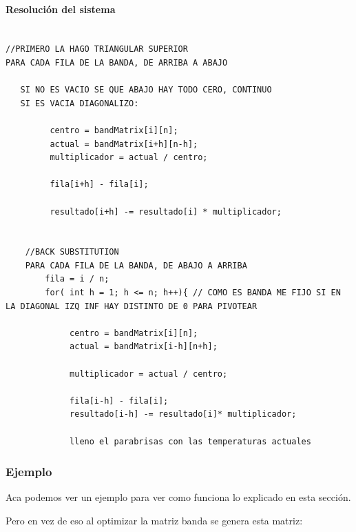 \paragraph{Resolución del sistema}

\begin{verbatim}

//PRIMERO LA HAGO TRIANGULAR SUPERIOR
PARA CADA FILA DE LA BANDA, DE ARRIBA A ABAJO
		
   SI NO ES VACIO SE QUE ABAJO HAY TODO CERO, CONTINUO
   SI ES VACIA DIAGONALIZO:
        
         centro = bandMatrix[i][n];
         actual = bandMatrix[i+h][n-h];
         multiplicador = actual / centro;
		
         fila[i+h] - fila[i];

         resultado[i+h] -= resultado[i] * multiplicador;
   

    //BACK SUBSTITUTION
    PARA CADA FILA DE LA BANDA, DE ABAJO A ARRIBA
        fila = i / n;
        for( int h = 1; h <= n; h++){ // COMO ES BANDA ME FIJO SI EN LA DIAGONAL IZQ INF HAY DISTINTO DE 0 PARA PIVOTEAR
           
             centro = bandMatrix[i][n];
             actual = bandMatrix[i-h][n+h];
           
             multiplicador = actual / centro;
		
             fila[i-h] - fila[i];
             resultado[i-h] -= resultado[i]* multiplicador;
                
             lleno el parabrisas con las temperaturas actuales
\end{verbatim}


\subsubsection{Ejemplo}

Aca podemos ver un ejemplo para ver como funciona lo explicado en esta sección.


Pero en vez de eso al optimizar la matriz banda se genera esta matriz:

